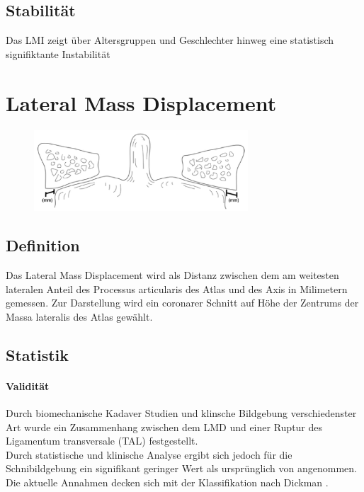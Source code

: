 \documentclass{report}
\begin{document}
\subsection{Stabilität}
Das LMI zeigt über Altersgruppen und Geschlechter hinweg eine statistisch signifiktante Instabilität \cite{Chaput2011}




\section{Lateral Mass Displacement}
\begin{figure}[h]
        \includegraphics[width=8cm]{LMD.png}
\end{figure}
\subsection{Definition}
Das Lateral Mass Displacement wird als Distanz zwischen dem am weitesten lateralen Anteil des Processus articularis des Atlas und des Axis in Milimetern gemessen.
Zur Darstellung wird ein coronarer Schnitt auf Höhe der Zentrums der Massa lateralis des Atlas gewählt.
\cite{Bono2007}

\subsection{Statistik}


\paragraph{Validität}
Durch biomechanische Kadaver Studien \cite{Woods2017,Spence1970} und klinsche Bildgebung verschiedenster Art \cite{Radcliff2010,Perez_Orribo_2016,Heller1993,Radcliff2013} wurde ein Zusammenhang zwischen dem LMD und einer Ruptur des Ligamentum transversale (TAL) festgestellt.\\
Durch statistische und klinische Analyse ergibt sich jedoch für die Schnibildgebung ein signifikant \cite{Woods2017} geringer Wert als ursprünglich von angenommen. \cite{Spence1970} 
Die aktuelle Annahmen decken sich mit der Klassifikation nach Dickman \cite{Dickman1996}. 
\end{document}

